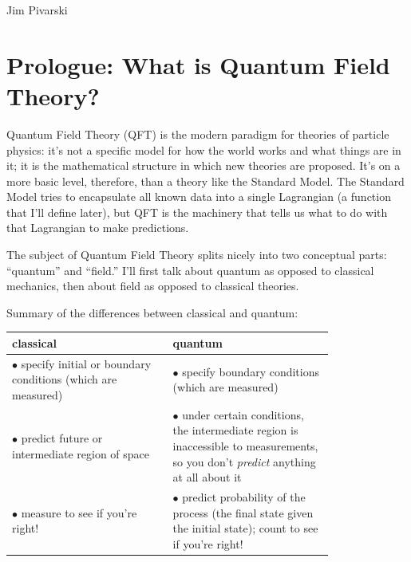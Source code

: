 \documentclass[12pt]{article}
\begin{document}
\begin{flushright}
  Jim Pivarski
\end{flushright}

\section*{Prologue: What is Quantum Field Theory?}

Quantum Field Theory (QFT) is the modern paradigm for theories of
particle physics: it's not a specific model for how the world works
and what things are in it; it is the mathematical structure in which
new theories are proposed.  It's on a more basic level, therefore,
than a theory like the Standard Model.  The Standard Model tries to
encapsulate all known data into a single Lagrangian (a function that
I'll define later), but QFT is the machinery that tells us what to do
with that Lagrangian to make predictions.

The subject of Quantum Field Theory splits nicely into two conceptual
parts: ``quantum'' and ``field.''  I'll first talk about quantum as
opposed to classical mechanics, then about field as opposed to
classical theories.

Summary of the differences between classical and quantum:
\begin{center}
  \begin{tabular}{p{0.4\linewidth} | p{0.4\linewidth}}
    classical & quantum \\\hline
    $\bullet$ specify initial or boundary conditions (which are
    measured) & $\bullet$ specify boundary conditions (which are
    measured) \\
    $\bullet$ predict future or intermediate region of space &
    $\bullet$ under certain conditions, the intermediate region is
    inaccessible to measurements, so you don't {\it predict} anything
    at all about it \\
    $\bullet$ measure to see if you're right! & $\bullet$ predict
    probability of the process (the final state given the initial
    state); count to see if you're right!
  \end{tabular}
\end{center}
\end{document}
